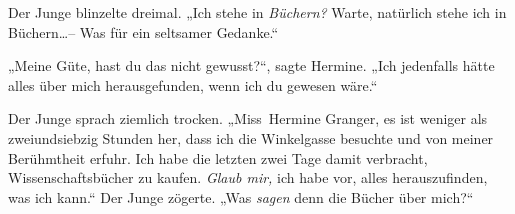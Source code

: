 Der Junge blinzelte dreimal. „Ich stehe in \emph{Büchern?} Warte, natürlich stehe ich in Büchern…– Was für ein seltsamer Gedanke.“

„Meine Güte, hast du das nicht gewusst?“, sagte Hermine. „Ich jedenfalls hätte alles über mich herausgefunden, wenn ich du gewesen wäre.“

Der Junge sprach ziemlich trocken. „Miss~Hermine Granger, es ist weniger als zweiundsiebzig Stunden her, dass ich die Winkelgasse besuchte und von meiner Berühmtheit erfuhr. Ich habe die letzten zwei Tage damit verbracht, Wissenschaftsbücher zu kaufen. \emph{Glaub mir,} ich habe vor, alles herauszufinden, was ich kann.“ Der Junge zögerte. „Was \emph{sagen} denn die Bücher über mich?“

